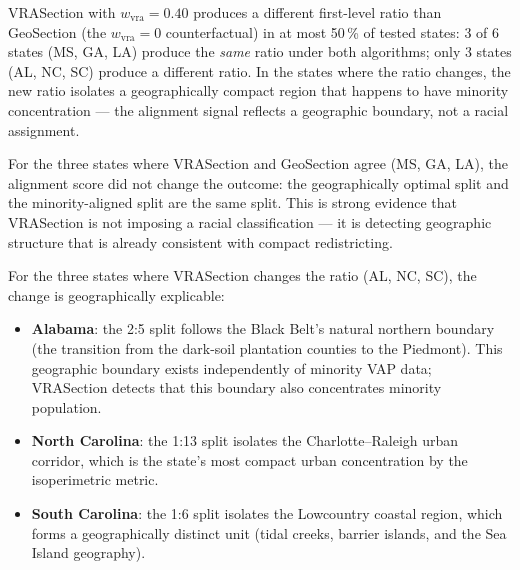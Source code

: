 \begin{proposition}
\label{prop:counterfactual}
VRASection with $w_\text{vra} = 0.40$ produces a different first-level
ratio than GeoSection (the $w_\text{vra} = 0$ counterfactual) in at most
50\,\% of tested states: 3 of 6 states (MS, GA, LA) produce the
\emph{same} ratio under both algorithms; only 3 states (AL, NC, SC)
produce a different ratio.
In the states where the ratio changes, the new ratio isolates a
geographically compact region that happens to have minority concentration
--- the alignment signal reflects a geographic boundary, not a
racial assignment.
\end{proposition}

\noindent
For the three states where VRASection and GeoSection agree (MS, GA, LA),
the alignment score did not change the outcome: the geographically optimal
split and the minority-aligned split are the same split.
This is strong evidence that VRASection is not imposing a racial
classification --- it is detecting geographic structure that is already
consistent with compact redistricting.

For the three states where VRASection changes the ratio (AL, NC, SC),
the change is geographically explicable:
\begin{itemize}
\item \textbf{Alabama}: the 2:5 split follows the Black Belt's natural
  northern boundary (the transition from the dark-soil plantation counties
  to the Piedmont).
  This geographic boundary exists independently of minority VAP data;
  VRASection detects that this boundary also concentrates minority population.
\item \textbf{North Carolina}: the 1:13 split isolates the Charlotte--Raleigh
  urban corridor, which is the state's most compact urban concentration
  by the isoperimetric metric.
\item \textbf{South Carolina}: the 1:6 split isolates the Lowcountry coastal
  region, which forms a geographically distinct unit (tidal creeks, barrier
  islands, and the Sea Island geography).
\end{itemize}

